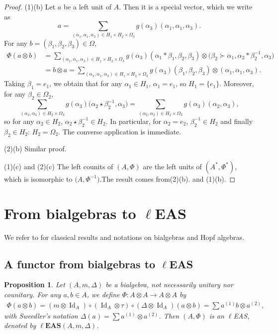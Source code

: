 \documentclass[pdftex]{sigma}
\numberwithin{equation}{section}
\newtheorem{Proposition}[Theorem]{Proposition}
 { \theoremstyle{definition}
\newtheorem{Definition}[Theorem]{Definition}
\newtheorem{Note}[Theorem]{Note}
\newtheorem{Example}[Theorem]{Example}
\newtheorem{Remark}[Theorem]{Remark}
\newtheorem{Notation}[Theorem]{Notation}}
\newcommand{\leas}{\ell\mathbf{EAS}}
\begin{document}
\begin{proof}
(1)(b) Let $a$ be a left unit of $A$. Then it is a special vector, which we write as
\[a=\sum_{(\alpha_1,\alpha_1,\alpha_3)\in H_1\times H_2\times \Omega_3}g(\alpha_3)(\alpha_1,\alpha_1,\alpha_3).\]
For any $b=(\beta_1,\beta_2,\beta_3)\in \Omega$,
\begin{align*}
\Phi(a\otimes b)&=\sum_{(\alpha_1,\alpha_1,\alpha_3)\in H_1\times H_2\times \Omega_3}g(\alpha_3)(\alpha_1*\beta_1,\beta_2,\beta_3)\otimes \bigl(\beta_2\succ \alpha_1,\alpha_2*\beta_2^{-1},\alpha_3\bigr)\\
&=b\otimes a=\sum_{(\alpha_1,\alpha_1,\alpha_3)\in H_1\times H_2\times \Omega_3}g(\alpha_3)(\beta_1,\beta_2,\beta_3)\otimes (\alpha_1,\alpha_1,\alpha_3).
\end{align*}
Taking $\beta_1=e_1$, we obtain that for any $\alpha_1\in H_1$, $\alpha_1=e_1$, so $H_1=\{e_1\}$. Moreover, for any $\beta_2\in \Omega_2$,
\[\sum_{(\alpha_2,\alpha_3)\in H_2\times \Omega_3}g(\alpha_3)\bigl(\alpha_2\star \beta_2^{-1},\alpha_3\bigr)=\sum_{(\alpha_2,\alpha_3)\in H_2\times \Omega_3}g(\alpha_3)(\alpha_2,\alpha_3),\]
so for any $\alpha_2\in H_2$, $\alpha_2\star \beta_2^{-1}\in H_2$. In particular, for $\alpha_2=e_2$, $\beta_2^{-1}\in H_2$ and finally $\beta_2\in H_2$: $H_2=\Omega_2$. The converse application is immediate.

(2)(b) Similar proof.

(1)(c) and (2)(c) The left counits of $(A,\Phi)$ are the left units of $(A^*,\Phi^*)$, which is isomorphic to $\bigl(A,\Phi^{-1}\bigr)$.The result comes from(2)(b). and (1)(b). \end{proof}


\section[From bialgebras to lEAS]{From bialgebras to $\boldsymbol{\ell}$EAS}

We refer to \cite{Abe1980,Cartier2021,Sweedler1969} for classical results and notations on bialgebras and Hopf algebras.

\subsection[A functor from bialgebras to lEAS]{A functor from bialgebras to $\boldsymbol{\ell}$EAS}

\begin{Proposition} \label{prop5.1}
Let $(A,m,\Delta)$ be a bialgebra, not necessarily unitary nor counitary. For any $a,b\in A$, we define $\Phi\colon A\otimes A\longrightarrow A\otimes A$ by
\begin{align*}
\Phi(a\otimes b) =(m\otimes \operatorname{Id}_A)\circ (\operatorname{Id}_A\otimes \tau)\circ (\Delta\otimes \operatorname{Id}_A)(a\otimes b)=\sum a^{(1)}b\otimes a^{(2)},
\end{align*}
with Sweedler's notation $\Delta(a)=\sum a^{(1)}\otimes a^{(2)}$. Then $(A,\Phi)$ is an $\ell$EAS, denoted by $\leas(A,\allowbreak m,\Delta)$.
\end{Proposition}
\end{document}
